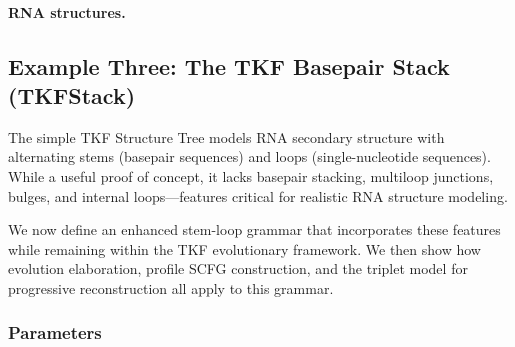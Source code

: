 \paragraph{RNA structures.}



\subsection{Example Three: The TKF Basepair Stack (TKFStack)}
\label{sec:rna-evol}

The simple TKF Structure Tree models RNA secondary structure with
alternating stems (basepair sequences) and loops (single-nucleotide
sequences). While a useful proof of concept, it lacks basepair stacking,
multiloop junctions, bulges, and internal loops---features critical for
realistic RNA structure modeling.

We now define an enhanced stem-loop grammar that incorporates these
features while remaining within the TKF evolutionary framework. We then
show how evolution elaboration, profile SCFG construction, and the
triplet model for progressive reconstruction all apply to this grammar.

\subsubsection{Parameters}

